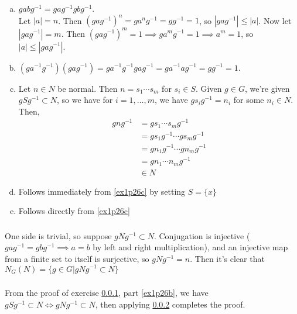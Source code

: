 \documentclass{article}
\newcommand{\set}[1]{ \{ #1 \} }
\newcommand{\inv}[1]{ {#1}^{-1} }
\newcommand{\norm}[1]{|#1|}
\newcommand{\vbar}{\vert}
\begin{document}
\subsubsection{}\label{ex1p26}
\begin{enumerate}[(a)]
\item \label{ex1p26a}
$gab\inv{g}=ga\inv{g}gb\inv{g}$.\\
Let $\norm{a}=n$. Then $(ga\inv{g})^n = ga^n\inv{g} = g\inv{g}=1$, so $\norm{ga\inv{g}} \leq \norm{a}$. Now let $\norm{ga\inv{g}} = m$. Then $(ga\inv{g})^m = 1\implies ga^m\inv{g} = 1\implies a^m = 1$, so $\norm{a} \leq \norm{ga\inv{g}}$.
\item \label{ex1p26b}
$(g\inv{a}\inv{g})(ga\inv{g}) = g\inv{a}\inv{g}ga\inv{g} = g\inv{a}a\inv{g} = g\inv{g} = 1$.
\item \label{ex1p26c}
Let $n\in N$ be normal. Then $n=s_1\cdots s_m$ for $s_i\in S$. Given $g\in G$, we're given $gS\inv{g} \subset N$, so we have for $i=1,\ldots, m$, we have $gs_i\inv{g} = n_i$ for some $n_i \in N$. Then,
\begin{align*}
gn\inv{g} &= gs_1\cdots s_m\inv{g}\\
&= gs_1\inv{g}\cdots gs_m\inv{g}\\
&= gn_1\inv{g}\cdots gn_m\inv{g}\\
&= gn_1\cdots n_m\inv{g}\\
&\in N
\end{align*}
\item \label{ex1p26d}
Follows immediately from \ref{ex1p26c} by setting $S=\set{x}$
\item \label{ex1p26e}
Follows directly from \ref{ex1p26c}
\end{enumerate}
\subsubsection{}\label{ex1p27}
One side is trivial, so suppose $gN\inv{g} \subset N$. Conjugation is injective ($ga\inv{g} = gb\inv{g} \implies a = b$ by left and right multiplication), and an injective map from a finite set to itself is surjective, so $gN\inv{g} = n$. Then it's clear that $N_G(N) = \set{g \in G \vbar gN\inv{g} \subset N}$
\subsubsection{}\label{ex1p28}
From the proof of exercise \ref{ex1p26}, part \ref{ex1p26b}, we have $gS\inv{g} \subset N \iff gN\inv{g} \subset N$, then applying \ref{ex1p27} completes the proof.
\end{document}
